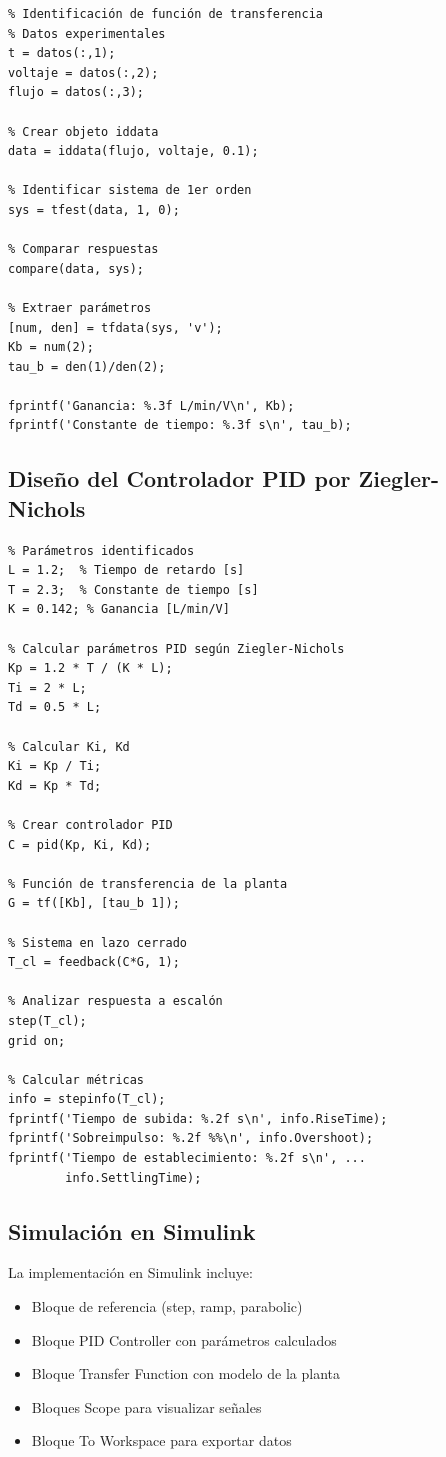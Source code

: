 \documentclass[conference]{IEEEtran}
\begin{document}
\begin{verbatim}
% Identificación de función de transferencia
% Datos experimentales
t = datos(:,1);
voltaje = datos(:,2);
flujo = datos(:,3);

% Crear objeto iddata
data = iddata(flujo, voltaje, 0.1);

% Identificar sistema de 1er orden
sys = tfest(data, 1, 0);

% Comparar respuestas
compare(data, sys);

% Extraer parámetros
[num, den] = tfdata(sys, 'v');
Kb = num(2);
tau_b = den(1)/den(2);

fprintf('Ganancia: %.3f L/min/V\n', Kb);
fprintf('Constante de tiempo: %.3f s\n', tau_b);
\end{verbatim}

\subsection{Diseño del Controlador PID por Ziegler-Nichols}

\begin{verbatim}
% Parámetros identificados
L = 1.2;  % Tiempo de retardo [s]
T = 2.3;  % Constante de tiempo [s]
K = 0.142; % Ganancia [L/min/V]

% Calcular parámetros PID según Ziegler-Nichols
Kp = 1.2 * T / (K * L);
Ti = 2 * L;
Td = 0.5 * L;

% Calcular Ki, Kd
Ki = Kp / Ti;
Kd = Kp * Td;

% Crear controlador PID
C = pid(Kp, Ki, Kd);

% Función de transferencia de la planta
G = tf([Kb], [tau_b 1]);

% Sistema en lazo cerrado
T_cl = feedback(C*G, 1);

% Analizar respuesta a escalón
step(T_cl);
grid on;

% Calcular métricas
info = stepinfo(T_cl);
fprintf('Tiempo de subida: %.2f s\n', info.RiseTime);
fprintf('Sobreimpulso: %.2f %%\n', info.Overshoot);
fprintf('Tiempo de establecimiento: %.2f s\n', ...
        info.SettlingTime);
\end{verbatim}

\subsection{Simulación en Simulink}

La implementación en Simulink incluye:
\begin{itemize}
\item Bloque de referencia (step, ramp, parabolic)
\item Bloque PID Controller con parámetros calculados
\item Bloque Transfer Function con modelo de la planta
\item Bloques Scope para visualizar señales
\item Bloque To Workspace para exportar datos
\end{itemize}
\end{document}
